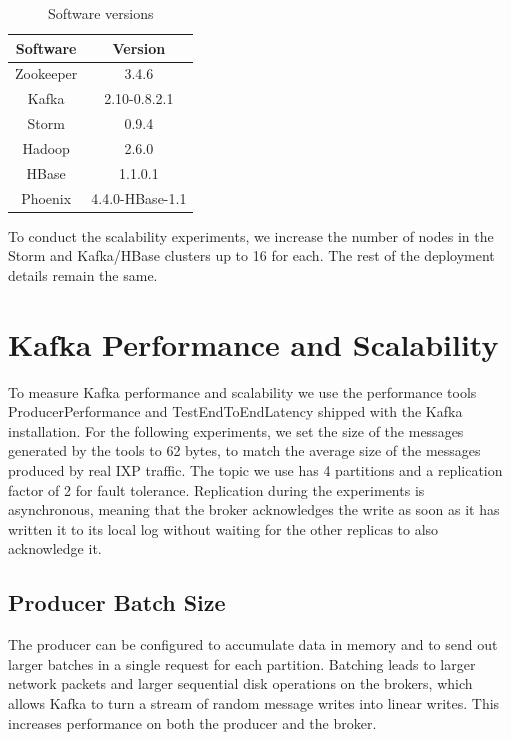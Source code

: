 \begin{table}[H]
\centering
\begin{tabular}{ |c|c| }
\hline
Software & Version \\ \hline \hline
Zookeeper & 3.4.6 \\ \hline
Kafka & 2.10-0.8.2.1 \\ \hline
Storm & 0.9.4 \\ \hline
Hadoop & 2.6.0 \\ \hline
HBase & 1.1.0.1 \\ \hline
Phoenix & 4.4.0-HBase-1.1 \\ \hline
\end{tabular}
\caption{Software versions}
\label{table:benchmarks_cluster_sw_specs}
\end{table}

To conduct the scalability experiments, we increase the number of nodes in the Storm and Kafka/HBase clusters up to 16 for each. The rest of the deployment details remain the same.


\section{Kafka Performance and Scalability}

To measure Kafka performance and scalability we use the performance tools ProducerPerformance and TestEndToEndLatency shipped with the Kafka installation. For the following experiments, we set the size of the messages generated by the tools to 62 bytes, to match the average size of the messages produced by real IXP traffic. The topic we use has 4 partitions and a replication factor of 2 for fault tolerance. Replication during the experiments is asynchronous, meaning that the broker acknowledges the write as soon as it has written it to its local log without waiting for the other replicas to also acknowledge it.

\subsection{Producer Batch Size}\label{subsection:benchmarks_kafka_batch}

The producer can be configured to accumulate data in memory and to send out larger batches in a single request for each partition. Batching leads to larger network packets and larger sequential disk operations on the brokers, which allows Kafka to turn a stream of random message writes into linear writes. This increases performance on both the producer and the broker. 


